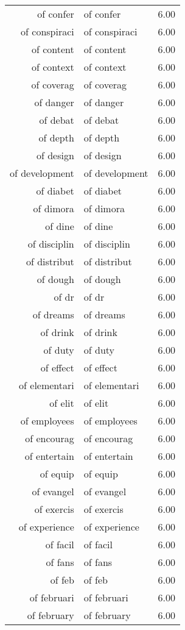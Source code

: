 \begin{table}[ht]
\begin{tabular}{rlr}
  of confer & of confer & 6.00 \\ 
  of conspiraci & of conspiraci & 6.00 \\ 
  of content & of content & 6.00 \\ 
  of context & of context & 6.00 \\ 
  of coverag & of coverag & 6.00 \\ 
  of danger & of danger & 6.00 \\ 
  of debat & of debat & 6.00 \\ 
  of depth & of depth & 6.00 \\ 
  of design & of design & 6.00 \\ 
  of development & of development & 6.00 \\ 
  of diabet & of diabet & 6.00 \\ 
  of dimora & of dimora & 6.00 \\ 
  of dine & of dine & 6.00 \\ 
  of disciplin & of disciplin & 6.00 \\ 
  of distribut & of distribut & 6.00 \\ 
  of dough & of dough & 6.00 \\ 
  of dr & of dr & 6.00 \\ 
  of dreams & of dreams & 6.00 \\ 
  of drink & of drink & 6.00 \\ 
  of duty & of duty & 6.00 \\ 
  of effect & of effect & 6.00 \\ 
  of elementari & of elementari & 6.00 \\ 
  of elit & of elit & 6.00 \\ 
  of employees & of employees & 6.00 \\ 
  of encourag & of encourag & 6.00 \\ 
  of entertain & of entertain & 6.00 \\ 
  of equip & of equip & 6.00 \\ 
  of evangel & of evangel & 6.00 \\ 
  of exercis & of exercis & 6.00 \\ 
  of experience & of experience & 6.00 \\ 
  of facil & of facil & 6.00 \\ 
  of fans & of fans & 6.00 \\ 
  of feb & of feb & 6.00 \\ 
  of februari & of februari & 6.00 \\ 
  of february & of february & 6.00 \\ 

\end{tabular}
\end{table}
